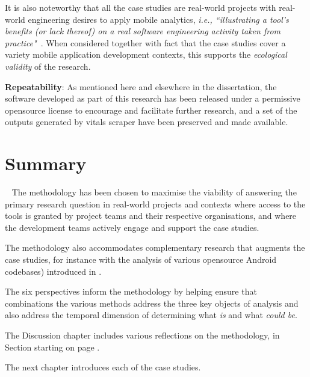  It is also noteworthy that all the case studies  are real-world projects with real-world engineering desires to apply mobile analytics, \emph{i.e., ``illustrating a tool’s benefits (or lack thereof) on a real software engineering activity taken from practice"}~. When considered together with fact that the case studies cover a variety mobile application development contexts, this supports the \emph{ecological validity} of the research.

\textbf{Repeatability}:
As mentioned here and elsewhere in the dissertation, the software developed as part of this research has been released under a permissive opensource license to encourage and facilitate further research, and a set of the outputs generated by vitals scraper have been preserved and made available.


\section[Summary of the methodology chapter]{Summary}~\label{methodology-summary-section}
The methodology has been chosen to maximise the viability of answering the primary research question in real-world projects and contexts where access to the tools is granted by project teams and their respective organisations, and where the development teams actively engage and support the case studies.

The methodology also accommodates complementary research that augments the case studies, for instance with the analysis of various opensource Android codebases) introduced in .

The six perspectives inform the methodology by helping ensure that combinations the various methods address the three key objects of analysis and also address the temporal dimension of determining what \textit{is} and what \textit{could be}.

The Discussion chapter includes various reflections on the methodology, in Section  starting on page \pageref{discussion-on-methodology-and-case-study-procedure}.

The next chapter introduces each of the case studies.